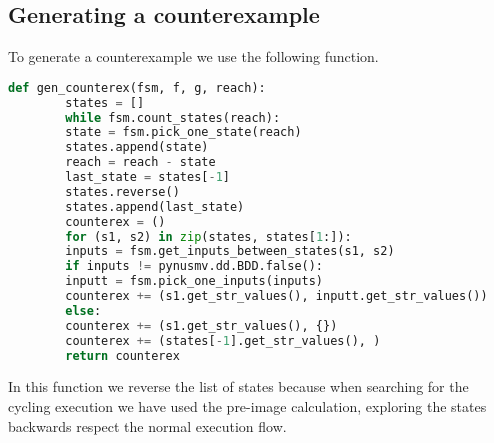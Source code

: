 \documentclass[9pt,oneside]{amsart}
\begin{document}
\begin{multicols}{2}
	\section{Generating a counterexample}\label{back}
	To generate a counterexample we use the following function.
	\begin{lstlisting}[language=Python]
		def gen_counterex(fsm, f, g, reach):
		states = []
		while fsm.count_states(reach):
		state = fsm.pick_one_state(reach)
		states.append(state)
		reach = reach - state
		last_state = states[-1]
		states.reverse()
		states.append(last_state)
		counterex = ()
		for (s1, s2) in zip(states, states[1:]):
		inputs = fsm.get_inputs_between_states(s1, s2)
		if inputs != pynusmv.dd.BDD.false():
		inputt = fsm.pick_one_inputs(inputs)
		counterex += (s1.get_str_values(), inputt.get_str_values())
		else:
		counterex += (s1.get_str_values(), {})
		counterex += (states[-1].get_str_values(), )
		return counterex
	\end{lstlisting}
	In this function we reverse the list of states because when searching for the cycling execution we have used the pre-image calculation, exploring the states backwards respect the normal execution flow.
\end{multicols}
\end{document}
